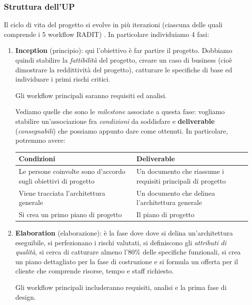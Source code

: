 \documentclass[a4paper,11pt]{article}
\begin{document}
\subsubsection{Struttura dell'UP}
Il ciclo di vita del progetto si evolve in più iterazioni (ciascuna delle quali comprende i 5 workflow RADIT)
.
In particolare individuiamo 4 fasi:
\begin{enumerate}
	\item \textbf{Inception} (principio): qui l'obiettivo è far partire il progetto. Dobbiamo quindi stabilire la \textit{fattibilità} del progetto, creare un caso di business (cioè dimostrare la reddittività del progetto), catturare le specifiche di base ed individuare i primi rischi critici. 

		Gli workflow principali saranno requisiti ed analisi. 

		Vediamo quelle che sono le \textit{milestone} associate a questa fase: vogliamo stabilire un'associazione fra \textit{condizioni} da soddisfare e \textbf{deliverable} (\textit{consegnabili}) che possiamo appunto dare come ottenuti.
In particolare, potremmo avere: 
\begin{table}[H]
	\center {}
	\begin{tabular} { p{7cm} | p{7cm} }
		\bfseries Condizioni & \bfseries Deliverable \\
		\hline
		Le persone coinvolte sono d'accordo sugli obiettivi di progetto &
		Un documento che riassume i requisiti principali di progetto \\
		Viene tracciata l'architettura generale &
		Un documento che delinea l'architettura generale \\
		Si crea un primo piano di progetto & Il piano di progetto
	\end{tabular}
\end{table}

\item \textbf{Elaboration} (elaborazione): è la fase dove dove si delina un'architettura eseguibile, si perfezionano i rischi valutati, si definiscono gli \textit{attributi di qualità}, si cerca di catturare almeno l'80\% delle specifiche funzionali, si crea un piano dettagliato per la fase di costruzione e si formula un offerta per il cliente che comprende risorse, tempo e staff richiesto. 

	Gli workflow principali includeranno requisiti, analisi e la prima fase di design.


\end{enumerate}
\end{document}

